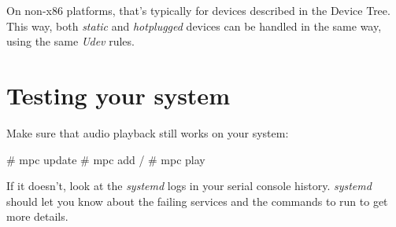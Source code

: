 On non-x86 platforms, that's typically for devices described in the
Device Tree. This way, both {\em static} and {\em hotplugged} devices
can be handled in the same way, using the same {\em Udev} rules.

\section{Testing your system}

Make sure that audio playback still works on your system:

\begin{bashinput}
# mpc update
# mpc add /
# mpc play
\end{bashinput}

If it doesn't, look at the {\em systemd} logs in your serial console
history. {\em systemd} should let you know about the failing services
and the commands to run to get more details.

